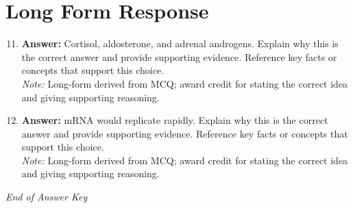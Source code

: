 \documentclass[12pt]{article}
\begin{document}
\section*{Long Form Response}
\begin{enumerate}[label=\arabic*.]
\setcounter{enumi}{10}
\item \textbf{Answer:} Cortisol, aldosterone, and adrenal androgens. Explain why this is the correct answer and provide supporting evidence. Reference key facts or concepts that support this choice.
\\ \textit{Note:} Long-form derived from MCQ; award credit for stating the correct idea and giving supporting reasoning.
\item \textbf{Answer:} mRNA would replicate rapidly. Explain why this is the correct answer and provide supporting evidence. Reference key facts or concepts that support this choice.
\\ \textit{Note:} Long-form derived from MCQ; award credit for stating the correct idea and giving supporting reasoning.
\end{enumerate}

\vfill
\noindent\textit{End of Answer Key}
\end{document}
